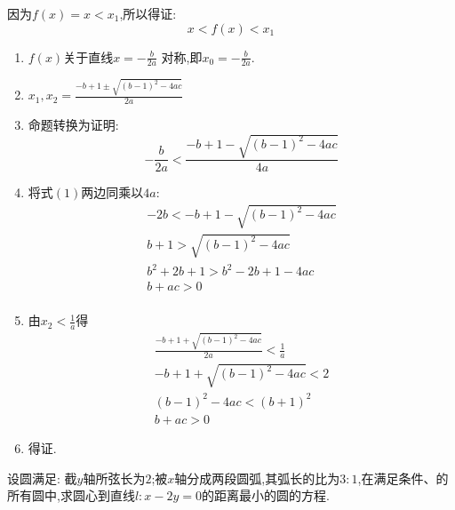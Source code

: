 \begin{questions}
\begin{proofsolution}
\begin{penum}
			      因为$f(x) = x < x_1$,所以得证:
			      \begin{equation*}
				      x  < f(x) < x_1
			      \end{equation*}

			\item
			      \begin{enumerate}[label=\protect\circled{\arabic*}]
				      \item $f(x)$关于直线$x=-\frac{b}{2a}$ 对称,即$x_0 = -\frac{b}{2a}$.
				      \item $x_1, x_2=\frac{-b + 1 \pm \sqrt{(b-1)^2-4ac}}{2a}$
				      \item 命题转换为证明:
				            \begin{equation*}
					            -\frac{b}{2a} < \frac{-b + 1 - \sqrt{(b-1)^2 - 4ac}}{4a} \tag{1}
				            \end{equation*}
				      \item 将式$(1)$两边同乘以$4a$:
				            \begin{align*}
					            -2b < -b + 1 - \sqrt{(b-1)^2 - 4ac} \\
					            b + 1 > \sqrt{(b-1)^2 - 4ac}        \\
					            b^2 + 2b + 1 > b^2 - 2b + 1 - 4ac   \\
					            b + ac > 0                          \\
				            \end{align*}
				      \item 由$x_2 < \frac1a$得
				            \begin{align*}
					            \frac{-b + 1 + \sqrt{(b-1)^2 - 4ac}}{2a} < \frac1a \\
					            -b + 1 + \sqrt{(b-1)^2 - 4ac} < 2                  \\
					            (b-1)^2 - 4ac < (b+1)^2                            \\
					            b + ac > 0
				            \end{align*}
				      \item 得证.
			      \end{enumerate}
		\end{penum}
	\end{proofsolution}

	\question 设圆满足:
	截$y$轴所弦长为$2$;被$x$轴分成两段圆弧,其弧长的比为$3:1$,在满足条件、的所有圆中,求圆心到直线$l:x-2y=0$的距离最小的圆的方程.


\end{questions}
